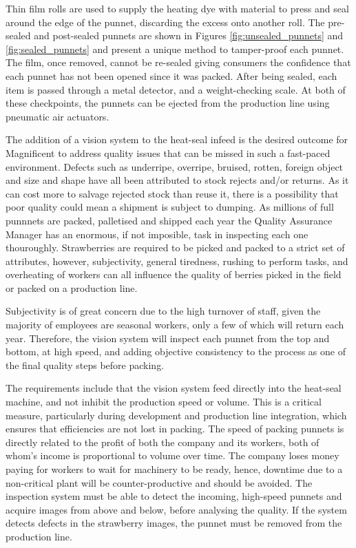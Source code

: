 \documentclass[fleqn,twoside,12pt]{report}
\begin{document}
Thin film rolls are used to supply the heating dye with material to press and seal around the edge of the punnet, discarding the excess onto another roll. The pre-sealed and post-sealed punnets are shown in Figures \ref{fig:unsealed_punnets} and \ref{fig:sealed_punnets} and present a unique method to tamper-proof each punnet. The film, once removed, cannot be re-sealed giving consumers the confidence that each punnet has not been opened since it was packed. After being sealed, each item is passed through a metal detector, and a weight-checking scale. At both of these checkpoints, the punnets can be ejected from the production line using pneumatic air actuators.

The addition of a vision system to the heat-seal infeed is the desired outcome for Magnificent to address quality issues that can be missed in such a fast-paced environment. Defects such as underripe, overripe, bruised, rotten, foreign object and size and shape have all been attributed to stock rejects and/or returns. As it can cost more to salvage rejected stock than reuse it, there is a possibility that poor quality could mean a shipment is subject to dumping. As millions of full punnnets are packed, palletised and shipped each year the Quality Assurance Manager has an enormous, if not imposible, task in inspecting each one thouroughly. Strawberries are required to be picked and packed to a strict set of attributes, however, subjectivity, general tiredness, rushing to perform tasks, and overheating of workers can all influence the quality of berries picked in the field or packed on a production line. 

Subjectivity is of great concern due to the high turnover of staff, given the majority of employees are seasonal workers, only a few of which will return each year. Therefore, the vision system will inspect each punnet from the top and bottom, at high speed, and adding objective consistency to the process as one of the final quality steps before packing.


The requirements include that the vision system feed directly into the heat-seal machine, and not inhibit the production speed or volume. This is a critical measure, particularly during development and production line integration, which ensures that efficiencies are not lost in packing. The speed of packing punnets is directly related to the profit of both the company and its workers, both of whom's income is proportional to volume over time. The company loses money paying for workers to wait for machinery to be ready, hence, downtime due to a non-critical plant will be counter-productive and should be avoided. The inspection system must be able to detect the incoming, high-speed punnets and acquire images from above and below, before analysing the quality. If the system detects defects in the strawberry images, the punnet must be removed from the production line. 
\end{document}
